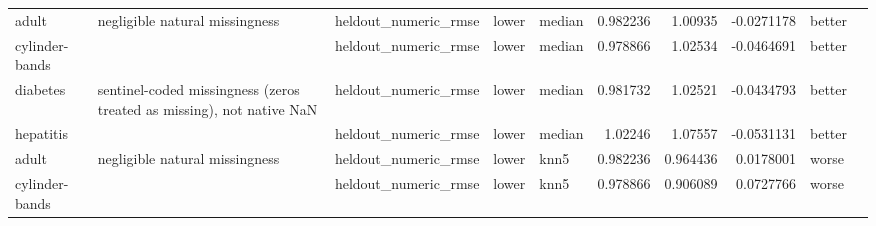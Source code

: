 \begin{table}[ht]
{\begin{tabular}{lllllrrrll}
 adult          & negligible natural missingness                                        & heldout\_numeric\_rmse           & lower              & median           &                   0.982236 &               1.00935  &                    -0.0271178   & better               &                                                                                                                    \\
 cylinder-bands &                                                                       & heldout\_numeric\_rmse           & lower              & median           &                   0.978866 &               1.02534  &                    -0.0464691   & better               &                                                                                                                    \\
 diabetes       & sentinel-coded missingness (zeros treated as missing), not native NaN & heldout\_numeric\_rmse           & lower              & median           &                   0.981732 &               1.02521  &                    -0.0434793   & better               &                                                                                                                    \\
 hepatitis      &                                                                       & heldout\_numeric\_rmse           & lower              & median           &                   1.02246  &               1.07557  &                    -0.0531131   & better               &                                                                                                                    \\
 adult          & negligible natural missingness                                        & heldout\_numeric\_rmse           & lower              & knn5             &                   0.982236 &               0.964436 &                     0.0178001   & worse                &                                                                                                                    \\
 cylinder-bands &                                                                       & heldout\_numeric\_rmse           & lower              & knn5             &                   0.978866 &               0.906089 &                     0.0727766   & worse                &                                                                                                                    \\

\end{tabular}}
\end{table}
